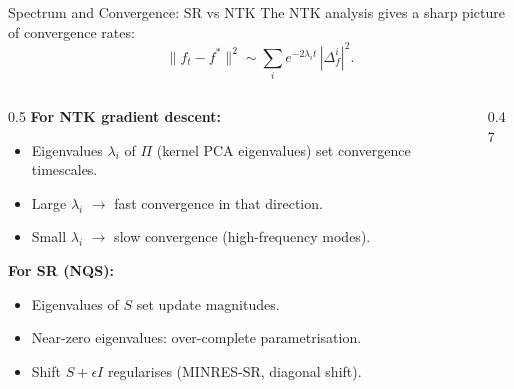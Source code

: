 \documentclass[aspectratio=169, 10pt]{beamer}
\begin{document}
\begin{frame}{Spectrum and Convergence: SR vs NTK}
  The NTK analysis gives a sharp picture of convergence rates:
  \[
    \|f_t - f^*\|^2 \sim \sum_i e^{-2\lambda_i t}\,|\Delta^i_f|^2.
  \]

  \begin{columns}[T]
    \begin{column}{0.5\textwidth}
      \textbf{For NTK gradient descent:}
      \begin{itemize}
        \item Eigenvalues $\lambda_i$ of $\Pi$ (kernel PCA eigenvalues) set convergence timescales.
        \item Large $\lambda_i$ $\to$ fast convergence in that direction.
        \item Small $\lambda_i$ $\to$ slow convergence (high-frequency modes).
      \end{itemize}

      \vspace{0.3em}
      \textbf{For SR (NQS):}
      \begin{itemize}
        \item Eigenvalues of $S$ set update magnitudes.
        \item Near-zero eigenvalues: over-complete parametrisation.
        \item Shift $S + \epsilon I$ regularises (MINRES-SR, diagonal shift).
      \end{itemize}
    \end{column}
    \begin{column}{0.47\textwidth}
    \end{column}
  \end{columns}
\end{frame}

\end{document}
